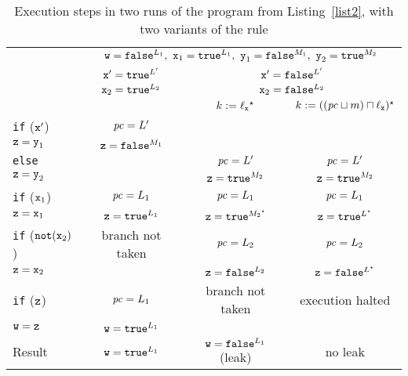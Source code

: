 \begin{table*}
\centering
\begin{tabular} {|l||@{\,}c@{\,}||@{\,}c@{\,}|@{\,}c@{\,}|}
\hline
&
\multicolumn{3}{c|}{$\texttt{w} = \texttt{false}^{L_1},\ \texttt{x}_1 =
  \texttt{true}^{L_1},\ \texttt{y}_1 = \texttt{false}^{M_1},\ \texttt{y}_2 =
  \texttt{true}^{M_2}$}
\\
\cline{2-4}
&
$\texttt{x}' = \texttt{true}^{L'}$
&
\multicolumn{2}{c|}{$\texttt{x}' = \texttt{false}^{L'}$}
\\
&
$\texttt{x}_2 = \texttt{true}^{L_2}$
&
\multicolumn{2}{c|}{$\texttt{x}_2 = \texttt{false}^{L_2}$}
\\
\cline{3-4}
&
&
$k:= \ell_{\texttt{x}}{}^\star$
&
$k:= ((\mathit{pc} \sqcup m) \sqcap \ell_{\texttt{x}}){}^\star$
\\
\hline
\texttt{if} ($\texttt{x}'$)&$\mathit{pc} = L'$&&\\
\quad$\texttt{z} = \texttt{y}_1$&$\texttt{z} = \texttt{false}^{M_1}$&&\\
\texttt{else}&&$\mathit{pc} = L'$&$\mathit{pc} = L'$\\
\quad$\texttt{z} = \texttt{y}_2$&&$\texttt{z} = \texttt{true}^{M_2}$&$\texttt{z} = \texttt{true}^{M_2}$\\
\texttt{if} ($\texttt{x}_1$)&$\mathit{pc} = L_1$&$\mathit{pc} = L_1$&$\mathit{pc} = L_1$\\
\quad$\texttt{z} = \texttt{x}_1$&$\texttt{z} = \texttt{true}^{L_1}$&$\texttt{z} = \texttt{true}^{M_2{}^\star}$&$\texttt{z} = \texttt{true}^{L{}^\star}$\\
\texttt{if} ($\texttt{not}(\texttt{x}_2)$)&branch not taken&$\mathit{pc} = L_2$&$\mathit{pc} = L_2$\\
\quad$\texttt{z} = \texttt{x}_2$& %
&$\texttt{z} = \texttt{false}^{L_2}$&$\texttt{z} = \texttt{false}^{L{}^\star}$\\
\texttt{if} ($\texttt{z}$)&$\mathit{pc} = L_1$&branch not taken&execution halted\\
\quad$\texttt{w} = \texttt{z}$&$\texttt{w} = \texttt{true}^{L_1}$&&\\
\hline
Result & $\texttt{w} = \texttt{true}^{L_1}$ & $\texttt{w} =
\texttt{false}^{L_1}$ (leak) & no leak\\
\hline
\end{tabular}
\caption{Execution steps in two runs of the program from Listing~\ref{list2}, with two variants of the rule }
\label{tblassn}
\end{table*}

